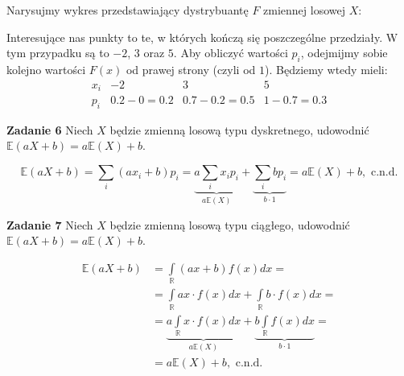 \documentclass[a4paper,12pt]{article}
\begin{document}
\noindent Narysujmy wykres przedstawiający dystrybuantę $F$ zmiennej losowej $X$:

\begin{center}
\end{center}

\noindent Interesujące nas punkty to te, w których kończą się poszczególne
przedziały. W tym przypadku są to $-2$, $3$ oraz $5$. Aby obliczyć wartości $p_i$,
odejmijmy sobie kolejno wartości $F(x)$ od prawej strony (czyli od $1$). Będziemy
wtedy mieli:
\[
    \begin{matrix*}
        x_i &   -2              &   3               &   5   \\
        p_i &   0.2 - 0 = 0.2   &   0.7 - 0.2 = 0.5 &   1 - 0.7 = 0.3 
    \end{matrix*}
\]

\noindent \newline \textbf{Zadanie 6} \newline
Niech $X$ będzie zmienną losową typu dyskretnego, udowodnić  
$\mathbb{E}(aX + b) = a \mathbb{E}(X) + b$.

\[
    \mathbb{E}(aX + b) = \sum\limits_{i} (a x_i + b) p_i =
        \underbrace{a \sum\limits_{i} x_i p_i}_{a \mathbb{E}(X)} 
        + \underbrace{\sum\limits_{i} b p_i}_{b \cdot 1} 
        = a \mathbb{E}(X) + b, \text{ c.n.d.}
\]

\noindent \newline \textbf{Zadanie 7} \newline
Niech $X$ będzie zmienną losową typu ciągłego, udowodnić  
$\mathbb{E}(aX + b) = a \mathbb{E}(X) + b$.

\begin{align*}
    \mathbb{E}(aX + b) &= \int\limits_{\mathbb{R}} (ax+b)f(x) dx = \\
    &= \int\limits_{\mathbb{R}} ax \cdot f(x) dx 
        + \int\limits_{\mathbb{R}} b \cdot f(x) dx = \\
    &= \underbrace{a \int\limits_{\mathbb{R}} x \cdot f(x) dx}_{a \mathbb{E}(X)} 
        + \underbrace{b \int\limits_{\mathbb{R}} f(x) dx}_{b \cdot 1} = \\
    &= a \mathbb{E}(X) + b, \text{ c.n.d.}
\end{align*}
\end{document}
